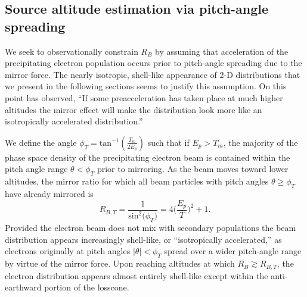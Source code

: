   \subsection{Source altitude estimation via pitch-angle spreading} \label{ssSourceAlt}

  We seek to observationally constrain $R_B$ by assuming that acceleration of
  the precipitating electron population occurs prior to pitch-angle spreading
  due to the mirror force. The nearly isotropic, shell-like appearance of 2-D
  distributions that we present in the following sections seems to justify this
  assumption. On this point \citet{Bostrom2003a} has observed, ``If some
  preacceleration has taken place at much higher altitudes the mirror effect
  will make the distribution look more like an isotropically accelerated
  distribution.''

  We define the angle $\phi_T = \textrm{tan}^{-1} ( \frac{T_m}{2 E_p} )$ such
  that if $E_p > T_m$, the majority of the phase space density of the
  precipitating electron beam is contained within the pitch angle range
  $ \theta < \phi_T$ prior to mirroring. As the beam moves toward lower
  altitudes, the mirror ratio for which all beam particles with pitch angles
  $\theta \geq \phi_T$ have already mirrored is
  \begin{equation} \label{ch6:RBTherm} R_{B,T} = \dfrac{1}{\mathrm{sin}^2 \big
      (\phi_T \big ) } = 4 \Big ( \dfrac{E_p}{T} \Big )^2 + 1.
  \end{equation}
  Provided the electron beam does not mix with secondary populations the beam
  distribution appears increasingly shell-like, or ``isotropically
  accelerated,'' as electrons originally at pitch angles
  $\vert \theta \vert < \phi_T$ spread over a wider pitch-angle range by virtue
  of the mirror force. Upon reaching altitudes at which $R_B \gtrsim R_{B,T}$,
  the electron distribution appears almost entirely shell-like except within the
  anti-earthward portion of the losscone. 


